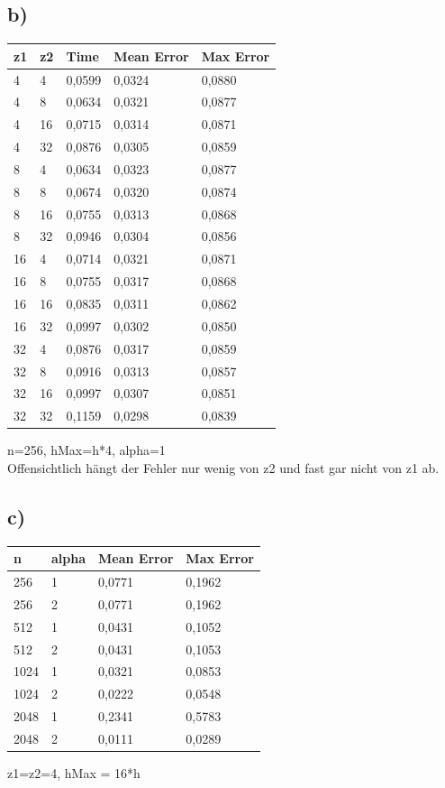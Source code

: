 \documentclass[paper = a4]{scrartcl}
\begin{document}
\subsection*{b)}
\begin{tabular}{l|l|l|l|l}
\hline
z1 & z2 & Time   & Mean Error & Max Error\\
\hline
4  & 4  & 0,0599 & 0,0324     & 0,0880   \\
4  & 8  & 0,0634 & 0,0321     & 0,0877   \\
4  & 16 & 0,0715 & 0,0314     & 0,0871   \\
4  & 32 & 0,0876 & 0,0305     & 0,0859   \\
8  & 4  & 0,0634 & 0,0323     & 0,0877   \\
8  & 8  & 0,0674 & 0,0320     & 0,0874   \\
8  & 16 & 0,0755 & 0,0313     & 0,0868   \\
8  & 32 & 0,0946 & 0,0304     & 0,0856   \\
16 & 4  & 0,0714 & 0,0321     & 0,0871   \\
16 & 8  & 0,0755 & 0,0317     & 0,0868   \\
16 & 16 & 0,0835 & 0,0311     & 0,0862   \\
16 & 32 & 0,0997 & 0,0302     & 0,0850   \\
32 & 4  & 0,0876 & 0,0317     & 0,0859   \\
32 & 8  & 0,0916 & 0,0313     & 0,0857   \\
32 & 16 & 0,0997 & 0,0307     & 0,0851   \\
32 & 32 & 0,1159 & 0,0298     & 0,0839   \\
\hline
\end{tabular}
n=256, hMax=h*4, alpha=1\\

Offensichtlich hängt der Fehler nur wenig von z2 und fast gar nicht von z1 ab.

\subsection*{c)}
\begin{tabular}{l|l|l|l}
\hline
n    & alpha & Mean Error & Max Error \\
\hline
256  & 1     & 0,0771     & 0,1962 \\
256  & 2     & 0,0771     & 0,1962 \\
512  & 1     & 0,0431     & 0,1052 \\
512  & 2     & 0,0431     & 0,1053 \\
1024 & 1     & 0,0321     & 0,0853 \\
1024 & 2     & 0,0222     & 0,0548 \\
2048 & 1     & 0,2341     & 0,5783 \\
2048 & 2     & 0,0111     & 0,0289 \\
\hline
\end{tabular}
z1=z2=4, hMax = 16*h\\
\end{document}
